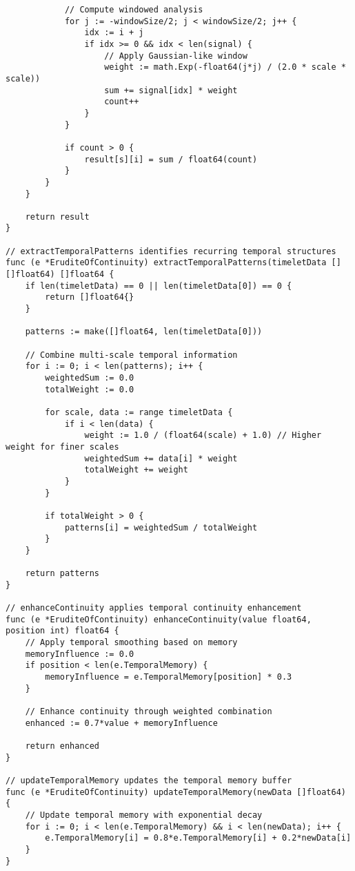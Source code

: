 \begin{tcolorbox}[colback=CodeBackground, colframe=DarkGray, title=Erudite of Continuity Implementation, fonttitle=\bfseries]
\begin{verbatim}
            // Compute windowed analysis
            for j := -windowSize/2; j < windowSize/2; j++ {
                idx := i + j
                if idx >= 0 && idx < len(signal) {
                    // Apply Gaussian-like window
                    weight := math.Exp(-float64(j*j) / (2.0 * scale * scale))
                    sum += signal[idx] * weight
                    count++
                }
            }
            
            if count > 0 {
                result[s][i] = sum / float64(count)
            }
        }
    }
    
    return result
}

// extractTemporalPatterns identifies recurring temporal structures
func (e *EruditeOfContinuity) extractTemporalPatterns(timeletData [][]float64) []float64 {
    if len(timeletData) == 0 || len(timeletData[0]) == 0 {
        return []float64{}
    }
    
    patterns := make([]float64, len(timeletData[0]))
    
    // Combine multi-scale temporal information
    for i := 0; i < len(patterns); i++ {
        weightedSum := 0.0
        totalWeight := 0.0
        
        for scale, data := range timeletData {
            if i < len(data) {
                weight := 1.0 / (float64(scale) + 1.0) // Higher weight for finer scales
                weightedSum += data[i] * weight
                totalWeight += weight
            }
        }
        
        if totalWeight > 0 {
            patterns[i] = weightedSum / totalWeight
        }
    }
    
    return patterns
}

// enhanceContinuity applies temporal continuity enhancement
func (e *EruditeOfContinuity) enhanceContinuity(value float64, position int) float64 {
    // Apply temporal smoothing based on memory
    memoryInfluence := 0.0
    if position < len(e.TemporalMemory) {
        memoryInfluence = e.TemporalMemory[position] * 0.3
    }
    
    // Enhance continuity through weighted combination
    enhanced := 0.7*value + memoryInfluence
    
    return enhanced
}

// updateTemporalMemory updates the temporal memory buffer
func (e *EruditeOfContinuity) updateTemporalMemory(newData []float64) {
    // Update temporal memory with exponential decay
    for i := 0; i < len(e.TemporalMemory) && i < len(newData); i++ {
        e.TemporalMemory[i] = 0.8*e.TemporalMemory[i] + 0.2*newData[i]
    }
}


\end{verbatim}
\end{tcolorbox}
